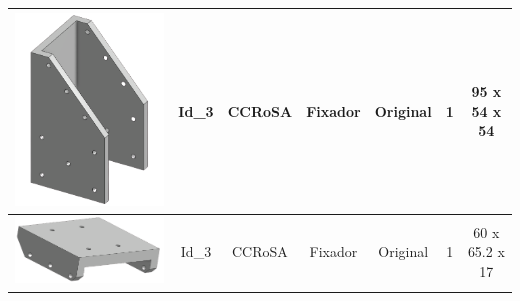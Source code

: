 \documentclass[
12pt,					%
openright,				%
twoside,				%
a4paper,				%
english,
brazil
]{ABNT/abntex2_report}
\begin{document}
\begin{table}[H]
\begin{adjustbox}{max width=\textwidth}
\begin{tabular}{|c|c|c|c|c|c|c|}
		\includegraphics[scale=0.12]{appendix/fix2.png}       & Id\_3 & CCRoSA         & Fixador             & Original             & 1          & 95 x 54 x 54          \\ \hline
		\rowcolor[HTML]{EFEFEF} 
		\includegraphics[scale = 0.12]{appendix/fix22.png}     & Id\_3 & CCRoSA         & Fixador             & Original             & 1          & 60 x 65.2 x 17        \\ \hline

\end{tabular}
\end{adjustbox}
\end{table}
\end{document}
